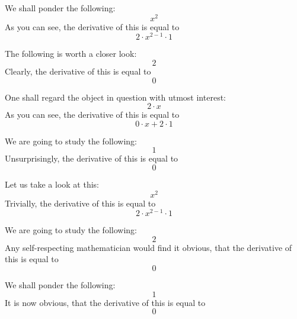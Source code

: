 \documentclass{article}
\begin{document}
We shall ponder the following:
\begin{equation}
x ^{2 } 
\end{equation}
As you can see, the derivative of this is equal to
\begin{equation}
2 \cdot x ^{2 - 1 } \cdot 1 
\end{equation}

The following is worth a closer look:
\begin{equation}
2 
\end{equation}
Clearly, the derivative of this is equal to
\begin{equation}
0 
\end{equation}

One shall regard the object in question with utmost interest:
\begin{equation}
2 \cdot x 
\end{equation}
As you can see, the derivative of this is equal to
\begin{equation}
0 \cdot x + 2 \cdot 1 
\end{equation}

We are going to study the following:
\begin{equation}
1 
\end{equation}
Unsurprisingly, the derivative of this is equal to
\begin{equation}
0 
\end{equation}

Let us take a look at this:
\begin{equation}
x ^{2 } 
\end{equation}
Trivially, the derivative of this is equal to
\begin{equation}
2 \cdot x ^{2 - 1 } \cdot 1 
\end{equation}

We are going to study the following:
\begin{equation}
2 
\end{equation}
Any self-respecting mathematician would find it obvious, that the derivative of this is equal to
\begin{equation}
0 
\end{equation}

We shall ponder the following:
\begin{equation}
1 
\end{equation}
It is now obvious, that the derivative of this is equal to
\begin{equation}
0 
\end{equation}
\end{document}
